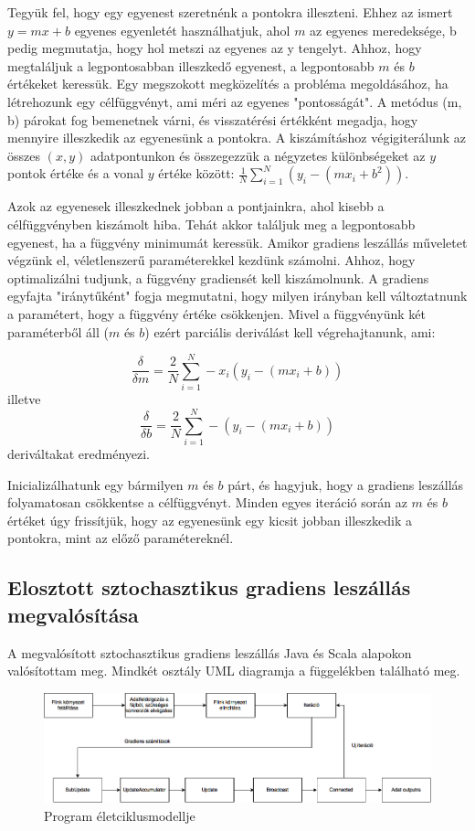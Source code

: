 \documentclass[a4paper,12pt]{article}
\begin{document}
Tegyük fel, hogy egy egyenest szeretnénk a pontokra illeszteni.  Ehhez az ismert $y = mx + b$ egyenes egyenletét használhatjuk, ahol $m$ az egyenes meredeksége, b pedig megmutatja, hogy hol metszi az egyenes az y tengelyt. Ahhoz, hogy megtaláljuk a legpontosabban illeszkedő egyenest, a legpontosabb $m$ és $b$ értékeket keressük.
Egy megszokott megközelítés a probléma megoldásához, ha létrehozunk egy célfüggvényt, ami méri az egyenes "pontosságát". A metódus (m, b) párokat fog bemenetnek várni, és visszatérési értékként megadja, hogy mennyire illeszkedik az egyenesünk a pontokra. A kiszámításhoz végigiterálunk az összes $(x, y)$ adatpontunkon és összegezzük a négyzetes különbségeket az $y$ pontok értéke és a vonal $y$ értéke között: $ \frac{1}{N} \sum_{i=1}^{N} (y_{i} - (m x_{i} + b^2))$.

Azok az egyenesek illeszkednek jobban a pontjainkra, ahol kisebb a célfüggvényben kiszámolt hiba. Tehát akkor találjuk meg a legpontosabb egyenest, ha a függvény minimumát keressük.
Amikor gradiens leszállás műveletet végzünk el, véletlenszerű paraméterekkel kezdünk számolni. Ahhoz, hogy optimalizálni tudjunk, a függvény gradiensét kell kiszámolnunk. A gradiens egyfajta "iránytűként" fogja megmutatni, hogy milyen irányban kell változtatnunk a paramétert, hogy a függvény értéke csökkenjen. Mivel a függvényünk két paraméterből áll ($m$ és $b$) ezért parciális deriválást kell végrehajtanunk, ami:

\[\frac{ \delta }{ \delta m} =  \frac{2}{N}  \sum_{i=1}^{N} -x_{i} (y_{i} - (mx_{i} + b))\] illetve 
\[\frac{ \delta }{ \delta b} =  \frac{2}{N}  \sum_{i=1}^{N} - (y_{i} - (mx_{i} + b))\] deriváltakat eredményezi.

Inicializálhatunk egy bármilyen $m$ és $b$ párt, és hagyjuk, hogy a gradiens leszállás folyamatosan csökkentse a célfüggvényt. Minden egyes iteráció során az $m$ és $b$ értéket úgy frissítjük, hogy az egyenesünk egy kicsit jobban illeszkedik a pontokra, mint az előző paramétereknél. 

\subsection{Elosztott sztochasztikus gradiens leszállás megvalósítása}

A megvalósított sztochasztikus gradiens leszállás Java és Scala alapokon valósítottam meg. Mindkét osztály UML diagramja a függelékben található meg. 
\begin{figure}[H]
\centering
\includegraphics[width=130mm]{img/workflow.png}
\caption{Program életciklusmodellje} \label{}
\end{figure}
\end{document}
